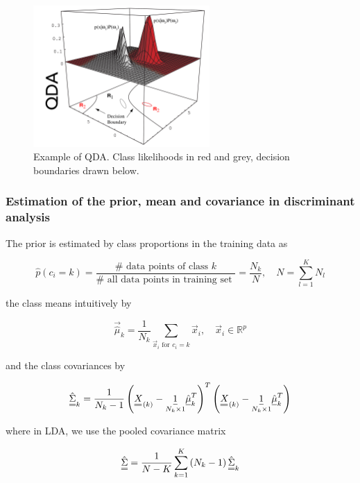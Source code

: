 \begin{figure}[!htb]
    \centering
    \includegraphics[width=0.6\textwidth]{figures/qda.pdf}
    \caption{Example of QDA. Class likelihoods in red and grey, decision boundaries drawn below.}
    \label{fig:qda}
\end{figure}

\subsubsection{Estimation of the prior, mean and covariance in discriminant analysis}
The \textcolor{blue1}{prior} is estimated by class proportions in the training data as

\begin{equation}
    \hat{p}\left(c_i=k\right)=\frac{\# \text { data points of class } k}{\# \text { all data points in training set }}=\frac{N_k}{N}, \quad N=\sum_{l=1}^K N_l
\end{equation}

the \textcolor{blue1}{class means} intuitively by

\begin{equation}
    \vec{\hat{\mu}}_k=\frac{1}{N_k} \sum_{\vec{x}_i \text { for } c_i=k} \vec{x}_i, \quad \vec{x}_i \in \mathbb{R}^p
\end{equation}

and the \textcolor{blue1}{class covariances} by

\begin{equation}
    \mat{\hat{\Sigma}}_k=\frac{1}{N_k-1}\left(\mat{X}_{(k)}-\underset{N_k \times 1}{\vec{1}} \vec{\hat{\mu}}^T_k\right)^T\left(\mat{X}_{(k)}-\underset{N_k \times 1}{\vec{1}} \vec{\hat{\mu}}^T_k\right)
\end{equation}

where in LDA, we use the pooled covariance matrix

\begin{equation}
    \mat{\hat{\Sigma}}=\frac{1}{N-K}\sum_{k=1}^K \left(N_k-1\right) \mat{\hat{\Sigma}}_k
\end{equation}

